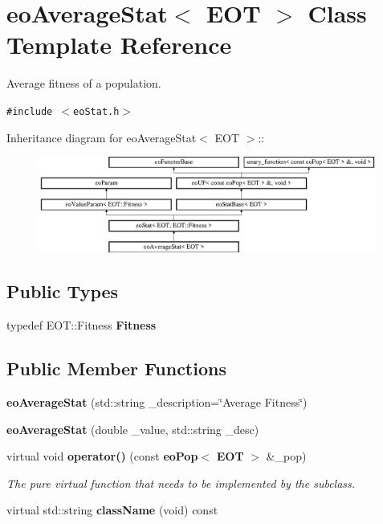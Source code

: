\section{eo\-Average\-Stat$<$ EOT $>$ Class Template Reference}
\label{classeo_average_stat}
Average fitness of a population.  


{\tt \#include $<$eo\-Stat.h$>$}

Inheritance diagram for eo\-Average\-Stat$<$ EOT $>$::\begin{figure}[H]
\begin{center}
\leavevmode
\includegraphics[height=3.15315cm]{classeo_average_stat}
\end{center}
\end{figure}
\subsection*{Public Types}
\begin{CompactItemize}
\item 
typedef EOT::Fitness {\bf Fitness}\label{classeo_average_stat_w0}

\end{CompactItemize}
\subsection*{Public Member Functions}
\begin{CompactItemize}
\item 
{\bf eo\-Average\-Stat} (std::string \_\-description=\char`\"{}Average Fitness\char`\"{})\label{classeo_average_stat_a0}

\item 
{\bf eo\-Average\-Stat} (double \_\-value, std::string \_\-desc)\label{classeo_average_stat_a1}

\item 
virtual void {\bf operator()} (const {\bf eo\-Pop}$<$ {\bf EOT} $>$ \&\_\-pop)\label{classeo_average_stat_a2}

\begin{CompactList}\small\item\em The pure virtual function that needs to be implemented by the subclass. \item\end{CompactList}\item 
virtual std::string {\bf class\-Name} (void) const \label{classeo_average_stat_a3}

\end{CompactItemize}
